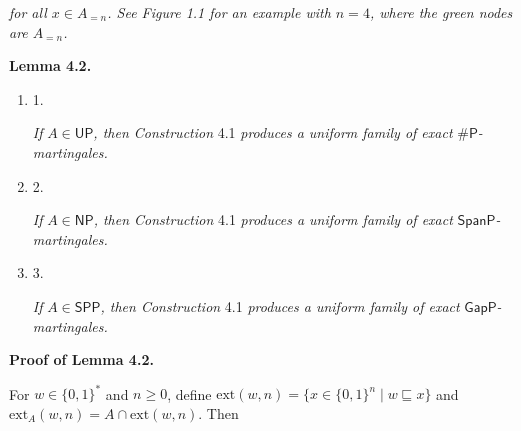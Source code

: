 \documentclass[10pt,a4paper]{article}
\begin{document}
\emph{for all $x\in A_{=n}$.
See Figure 1.1 for an example with $n=4$, where the green nodes are $A_{=n}$.}\par







\par\medskip\noindent\textbf{
\textbf{Lemma 4.2}\textbf{.}
}\par



\begin{enumerate}


\item[] 
1. 


\emph{If }$A\in\mathsf{UP}$\emph{, then Construction }4.1\emph{ produces a uniform family of exact }${\mathsf{\#}\mathsf{P}}$\emph{-martingales.}\par





\item[] 
2. 


\emph{If }$A\in\mathsf{NP}$\emph{, then Construction }4.1\emph{ produces a uniform family of exact }$\mathsf{SpanP}$\emph{-martingales.}\par





\item[] 
3. 


\emph{If }$A\in\mathsf{SPP}$\emph{, then Construction }4.1\emph{ produces a uniform family of exact }$\mathsf{GapP}$\emph{-martingales.}\par





\end{enumerate}






\par\medskip\noindent\textbf{Proof of Lemma 4.2.}\par




For $w\in\{0,1\}^{*}$ and $n\geq 0$, define $\mathrm{ext}(w,n)=\{x\in\{0,1\}^{n}\mid w\sqsubseteq x\}$ and
$\mathrm{ext}_{A}(w,n)=A\cap\mathrm{ext}(w,n)$. Then\par
\end{document}
